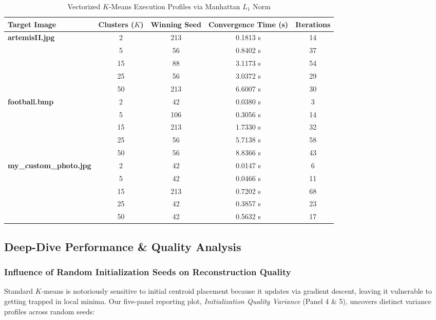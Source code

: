 \documentclass[twoside, 10pt]{article}
\begin{document}
\begin{table}[H]
\centering
\caption{Vectorized $K$-Means Execution Profiles via Manhattan $L_1$ Norm}\label{tab:l1_metrics}
\begin{tabular}{lcccc}
\toprule
\textbf{Target Image} & \textbf{Clusters ($K$)} & \textbf{Winning Seed} & \textbf{Convergence Time (s)} & \textbf{Iterations} \\
\midrule
\textbf{artemisII.jpg} & 2  & 213 & 0.1813 s & 14 \\
                       & 5  & 56  & 0.8402 s & 37 \\
                       & 15 & 88  & 3.1173 s & 54 \\
                       & 25 & 56  & 3.0372 s & 29 \\
                       & 50 & 213 & 6.6007 s & 30 \\
\midrule
\textbf{football.bmp}  & 2  & 42  & 0.0380 s & 3  \\
                       & 5  & 106 & 0.3056 s & 14 \\
                       & 15 & 213 & 1.7330 s & 32 \\
                       & 25 & 56  & 5.7138 s & 58 \\
                       & 50 & 56  & 8.8366 s & 43 \\
\midrule
\textbf{my\_custom\_photo.jpg} & 2  & 42  & 0.0147 s & 6  \\
                               & 5  & 42  & 0.0466 s & 11 \\
                               & 15 & 213 & 0.7202 s & 68 \\
                               & 25 & 42  & 0.3857 s & 23 \\
                               & 50 & 42  & 0.5632 s & 17 \\
\bottomrule
\end{tabular}
\end{table}

\subsection{Deep-Dive Performance \& Quality Analysis}

\subsubsection{Influence of Random Initialization Seeds on Reconstruction Quality}
Standard $K$-means is notoriously sensitive to initial centroid placement because it updates via gradient descent, leaving it vulnerable to getting trapped in local minima. Our five-panel reporting plot, \textit{Initialization Quality Variance} (Panel 4 \& 5), uncovers distinct variance profiles across random seeds:
\end{document}
